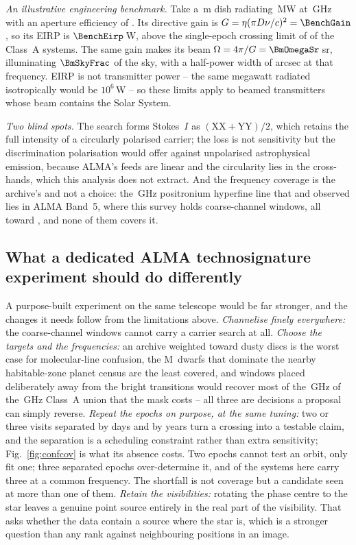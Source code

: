 \noindent\emph{An illustrative engineering benchmark.} Take a \BenchDiam\,m dish radiating \BenchPowerMW\,MW at
\BenchFreqGHz\,GHz with an aperture efficiency of \BenchEta. Its directive
gain is $G=\eta(\pi D\nu/c)^{2}=\BenchGain$, so its EIRP is
$\BenchEirp$\,W, above the single-epoch crossing limit of \BenchNSysA{} of the
\NSysClassA{} Class~A systems. The same gain makes its beam
$\Omega=4\pi/G=\BmOmegaSr$\,sr, illuminating $\BmSkyFrac$ of the sky, with a
half-power width of \BmArcsec{} arcsec at that frequency. EIRP is not transmitter power -- the same megawatt
radiated isotropically would be $10^{6}$\,W -- so these limits apply to
beamed transmitters whose beam contains the Solar System.

\noindent\emph{Two blind spots.} The search forms Stokes~$I$ as
$(\mathrm{XX}+\mathrm{YY})/2$, which retains the full intensity of a circularly polarised
carrier; the loss is not sensitivity but the discrimination
polarisation would offer against unpolarised astrophysical emission, because ALMA's feeds
are linear and the circularity lies in the cross-hands, which this analysis
does not extract. And the frequency coverage is the archive's and not a
choice: the \SbPriorFreqGHz\,GHz positronium hyperfine line that
\citet{Steffes1994} and \citet{Mauersberger1996} observed lies in ALMA Band~5,
where this survey holds
\LnBFiveWin{} coarse-channel windows, all toward \LnBFiveStars, and none of
them covers it.

\subsection{What a dedicated ALMA technosignature experiment should do
differently}
\label{sec:future}

A purpose-built experiment on the same telescope would be far stronger, and
the changes it needs follow from the limitations above. \emph{Channelise
finely everywhere:} the \NCoarse{} coarse-channel windows cannot carry a
carrier search at all.
\emph{Choose the targets and the frequencies:} an archive weighted toward
dusty discs is the worst case for molecular-line confusion, the M~dwarfs that
dominate the nearby habitable-zone planet census are the least covered, and
windows placed deliberately away from the bright transitions would recover
most of the \MkMaskAGHz\,GHz of the \CvUnionA\,GHz Class~A union that the
mask costs -- all three are decisions a
proposal can simply reverse. \emph{Repeat the epochs on purpose, at the same
tuning:} two or three visits separated by days and by years turn a crossing
into a testable claim, and the separation is a scheduling constraint rather
than extra sensitivity; Fig.~\ref{fig:confcov} is what its absence costs. Two
epochs cannot test an orbit, only fit one; three separated epochs
over-determine it, and \PaNSysThree{} of the \NSysClassA{} systems here carry
three at a common frequency. The shortfall is not coverage but a candidate
seen at more than one of them.
\emph{Retain the visibilities:} rotating the phase centre to the star leaves a
genuine point source entirely in the real part of the visibility. That asks
whether the data contain a source where the star is, which is a
stronger question than any rank
against neighbouring positions in an image.
